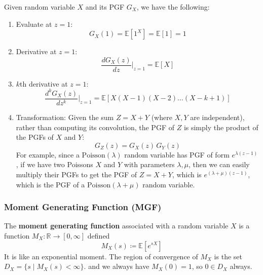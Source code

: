     \begin{lemma}
      Given random variable $X$ and its PGF $G_X$, we have the following: 
      \begin{enumerate}
        \item Evaluate at $z = 1$: 
        \begin{equation}
          G_X (1) = \mathbb{E}[1^X] = \mathbb{E}[1] = 1
        \end{equation}
        \item Derivative at $z = 1$: 
        \begin{equation}
          \frac{d G_X (z)}{d z} \bigg|_{z = 1} = \mathbb{E}[X]
        \end{equation}
        \item $k$th derivative at $z = 1$: 
        \begin{equation}
          \frac{d^k G_X (z)}{d z^k} \bigg|_{z = 1} = \mathbb{E}[X (X-1) (X-2) \ldots (X-k +1)]
        \end{equation}
        \item Transformation: Given the sum $Z = X + Y$ (where $X, Y$ are independent), rather than computing its convolution, the PGF of $Z$ is simply the product of the PGFs of $X$ and $Y$: 
        \begin{equation}
          G_Z (z) = G_X (z) \, G_Y (z)
        \end{equation}
        For example, since a $\mathrm{Poisson}(\lambda)$ random variable has PGF of form $e^{\lambda (z - 1)}$, if we have two Poissons $X$ and $Y$ with parameters $\lambda, \mu$, then we can easily multiply their PGFs to get the PGF of $Z = X + Y$, which is $e^{(\lambda + \mu)(z - 1)}$, which is the PGF of a $\mathrm{Poisson}(\lambda + \mu)$ random variable. 
      \end{enumerate}
    \end{lemma}

  \subsubsection{Moment Generating Function (MGF)}

    \begin{definition}
      The \textbf{moment generating function} associated with a random variable $X$ is a function $M_X: \mathbb{R} \longrightarrow [0, \infty]$ defined 
      \begin{equation}
        M_X (s) \coloneqq \mathbb{E}[e^{s X}]
      \end{equation}
      It is like an exponential moment. The region of convergence of $M_X$ is the set $D_X = \{s \mid M_X (s) < \infty\}$. 
      and we always have $M_X (0) = 1$, so $0 \in D_X$ always. 
    \end{definition}

